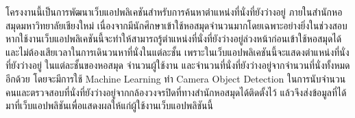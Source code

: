 \maketitle
\makesignature

\ifproject
\begin{abstractTH}
    โครงงานนี้เป็นการพัฒนาเว็บแอปพลิเคชันสำหรับการค้นหาตำแหน่งที่นั่งที่ยังว่างอยู่ 
    \enskip ภายในสำนักหอสมุดมหาวิทยาลัยเชียงใหม่ 
    เนื่องจากมีนักศึกษาเข้าใช้หอสมุดจำนวนมากโดยเฉพาะอย่างยิ่งในช่วงสอบ 
    หากใช้งานเว็บแอปพลิเคชันนี้จะทำให้สามารถรู้ตำแหน่งที่นั่งที่ยังว่างอยู่ล่วงหน้าก่อนเข้าใช้หอสมุดได้ 
    และไม่ต้องเสียเวลาในการเดินวนหาที่นั่งในแต่ละชั้น เพราะในเว็บแอปพลิเคชันนี้จะแสดงตำแหน่งที่นั่งที่ยังว่างอยู่
    \enskip ในแต่ละชั้นของหอสมุด จำนวนผู้ใช้งาน และจำนวนที่นั่งที่ยังว่างอยู่จากจำนวนที่นั่งทั้งหมดอีกด้วย 
    โดยจะมีการใช้ Machine Learning ทำ Camera Object Detection 
    ในการนับจำนวนคนและตรวจสอบที่นั่งที่ยังว่างอยู่จากกล้องวงจรปิดที่ทางสำนักหอสมุดได้ติดตั้งไว้ 
    แล้วจึงส่งข้อมูลที่ได้มาที่เว็บแอปพลิชันเพื่อแสดงผลให้แก่ผู้ใช้งานเว็บแอปพลิชันนี้    
\end{abstractTH}

\iffalse
\begin{dedication}
This document is dedicated to all Chiang Mai University students.

Dedication page is optional.
\end{dedication}
\fi %

\contentspage

\ifproject
\figurelistpage

\tablelistpage
\fi %



